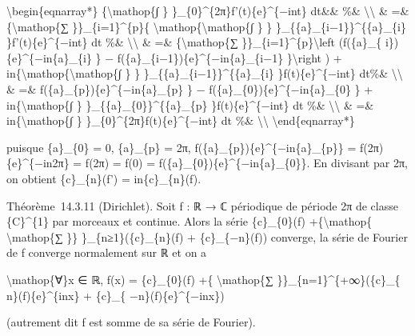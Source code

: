 \documentclass[]{article}
\begin{document}
\textbackslash{}begin\{eqnarray*\} \{\textbackslash{}mathop\{∫ \}
\}\_\{0\}\^{}\{2π\}f'(t)\{e\}\^{}\{−int\} dt\&\& \%\&
\textbackslash{}\textbackslash{} \& =\& \{\textbackslash{}mathop\{∑
\}\}\_\{i=1\}\^{}\{p\}\{
\textbackslash{}mathop\{\textbackslash{}mathop\{∫ \} \}
\}\_\{\{a\}\_\{i−1\}\}\^{}\{\{a\}\_\{i\} \}f'(t)\{e\}\^{}\{−int\} dt
\%\& \textbackslash{}\textbackslash{} \& =\& \{\textbackslash{}mathop\{∑
\}\}\_\{i=1\}\^{}\{p\}\textbackslash{}left (f(\{a\}\_\{
i\})\{e\}\^{}\{−in\{a\}\_\{i\} \} −
f(\{a\}\_\{i−1\})\{e\}\^{}\{−in\{a\}\_\{i−1\} \}\textbackslash{}right )
+ in\{\textbackslash{}mathop\{\textbackslash{}mathop\{∫ \} \}
\}\_\{\{a\}\_\{i−1\}\}\^{}\{\{a\}\_\{i\} \}f(t)\{e\}\^{}\{−int\} dt\%\&
\textbackslash{}\textbackslash{} \& =\&
f(\{a\}\_\{p\})\{e\}\^{}\{−in\{a\}\_\{p\} \} −
f(\{a\}\_\{0\})\{e\}\^{}\{−in\{a\}\_\{0\} \} +
in\{\textbackslash{}mathop\{∫ \} \}\_\{\{a\}\_\{0\}\}\^{}\{\{a\}\_\{p\}
\}f(t)\{e\}\^{}\{−int\} dt \%\& \textbackslash{}\textbackslash{} \& =\&
in\{\textbackslash{}mathop\{∫ \}
\}\_\{0\}\^{}\{2π\}f(t)\{e\}\^{}\{−int\} dt \%\&
\textbackslash{}\textbackslash{} \textbackslash{}end\{eqnarray*\}

puisque \{a\}\_\{0\} = 0, \{a\}\_\{p\} = 2π,
f(\{a\}\_\{p\})\{e\}\^{}\{−in\{a\}\_\{p\}\} = f(2π)\{e\}\^{}\{−in2π\} =
f(2π) = f(0) = f(\{a\}\_\{0\})\{e\}\^{}\{−in\{a\}\_\{0\}\}. En divisant
par 2π, on obtient \{c\}\_\{n\}(f') = in\{c\}\_\{n\}(f).

Théorème~14.3.11 (Dirichlet). Soit f : ℝ → ℂ périodique de période 2π de
classe \{C\}\^{}\{1\} par morceaux et continue. Alors la série
\textbar{}\{c\}\_\{0\}(f)\textbar{} +\{\textbackslash{}mathop\{
\textbackslash{}mathop\{∑ \}\}
\}\_\{n≥1\}(\textbar{}\{c\}\_\{n\}(f)\textbar{} +
\textbar{}\{c\}\_\{−n\}(f)\textbar{}) converge, la série de Fourier de f
converge normalement sur ℝ et on a

\textbackslash{}mathop\{∀\}x ∈ ℝ, f(x) = \{c\}\_\{0\}(f) +\{
\textbackslash{}mathop\{∑ \}\}\_\{n=1\}\^{}\{+∞\}(\{c\}\_\{
n\}(f)\{e\}\^{}\{inx\} + \{c\}\_\{ −n\}(f)\{e\}\^{}\{−inx\})

(autrement dit f est somme de sa série de Fourier).
\end{document}
